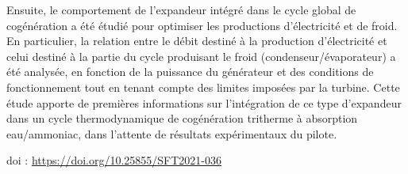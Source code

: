 {Ensuite, le comportement de l'expandeur intégré dans le cycle global de cogénération a été étudié pour optimiser les productions d'électricité et de froid. En particulier, la relation entre le débit destiné à la production d'électricité et celui destiné à la partie du cycle produisant le froid (condenseur/évaporateur) a été analysée, en fonction de la puissance du générateur et des conditions de fonctionnement tout en tenant compte des limites imposées par la turbine. Cette étude apporte de premières informations sur l'intégration de ce type d'expandeur dans un cycle thermodynamique de cogénération tritherme à absorption eau/ammoniac, dans l'attente de résultats expérimentaux du pilote.

 \vfill doi : \url{https://doi.org/10.25855/SFT2021-036}

}
 
